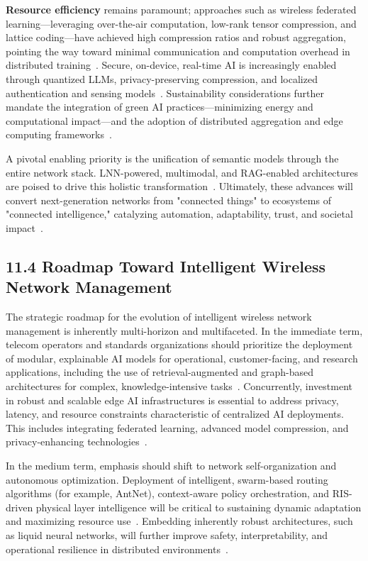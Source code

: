 \documentclass[11pt]{article}
\begin{document}
\textbf{Resource efficiency} remains paramount; approaches such as wireless federated learning—leveraging over-the-air computation, low-rank tensor compression, and lattice coding—have achieved high compression ratios and robust aggregation, pointing the way toward minimal communication and computation overhead in distributed training~\cite{ref17}. Secure, on-device, real-time AI is increasingly enabled through quantized LLMs, privacy-preserving compression, and localized authentication and sensing models~\cite{ref18,ref19,ref20,ref24}. Sustainability considerations further mandate the integration of green AI practices—minimizing energy and computational impact—and the adoption of distributed aggregation and edge computing frameworks~\cite{ref16,ref19,ref20,ref24,ref25}.

A pivotal enabling priority is the unification of semantic models through the entire network stack. LNN-powered, multimodal, and RAG-enabled architectures are poised to drive this holistic transformation~\cite{ref7,ref16,ref17,ref18,ref19,ref20,ref21,ref22,ref23,ref24,ref25,ref26,ref30,ref35,ref46,ref49}. Ultimately, these advances will convert next-generation networks from "connected things" to ecosystems of "connected intelligence," catalyzing automation, adaptability, trust, and societal impact~\cite{ref16,ref20,ref24,ref49}.

\subsection{11.4 Roadmap Toward Intelligent Wireless Network Management}

The strategic roadmap for the evolution of intelligent wireless network management is inherently multi-horizon and multifaceted. In the immediate term, telecom operators and standards organizations should prioritize the deployment of modular, explainable AI models for operational, customer-facing, and research applications, including the use of retrieval-augmented and graph-based architectures for complex, knowledge-intensive tasks~\cite{ref7,ref16,ref30}. Concurrently, investment in robust and scalable edge AI infrastructures is essential to address privacy, latency, and resource constraints characteristic of centralized AI deployments. This includes integrating federated learning, advanced model compression, and privacy-enhancing technologies~\cite{ref17,ref19,ref20,ref24,ref25,ref49}.

In the medium term, emphasis should shift to network self-organization and autonomous optimization. Deployment of intelligent, swarm-based routing algorithms (for example, AntNet), context-aware policy orchestration, and RIS-driven physical layer intelligence will be critical to sustaining dynamic adaptation and maximizing resource use~\cite{ref15,ref21,ref22,ref26,ref27,ref28,ref46}. Embedding inherently robust architectures, such as liquid neural networks, will further improve safety, interpretability, and operational resilience in distributed environments~\cite{ref19,ref30,ref35}.
\end{document}
